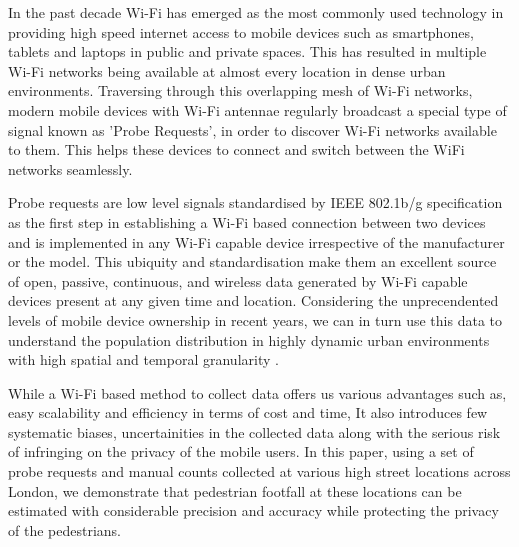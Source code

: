In the past decade Wi-Fi has emerged as the most commonly used technology in providing high speed internet access to mobile devices such as smartphones, tablets and laptops in public and private spaces. This has resulted in multiple Wi-Fi networks being available at almost every location in dense urban environments. Traversing through this overlapping mesh of Wi-Fi networks, modern mobile devices with Wi-Fi antennae regularly broadcast a special type of signal known as 'Probe Requests', in order to discover Wi-Fi networks available to them. This helps these devices to connect and switch between the WiFi networks seamlessly.

Probe requests are low level signals standardised by IEEE 802.1b/g specification \citep{ieee2013} as the first step in establishing a Wi-Fi based connection between two devices and is implemented in any Wi-Fi capable device irrespective of the manufacturer or the model. This ubiquity and standardisation make them an excellent source of open, passive, continuous, and wireless data generated by Wi-Fi capable devices present at any given time and location. Considering the unprecendented levels of mobile device ownership in recent years, we can in turn use this data to understand the population distribution in highly dynamic urban environments with high spatial and temporal granularity \citep{freud2015,konto2017}.

While a Wi-Fi based method to collect data offers us various advantages such as, easy scalability and efficiency in terms of cost and time, It also introduces few systematic biases, uncertainities in the collected data along with the serious risk of infringing on the privacy of the mobile users. In this paper, using a set of probe requests and manual counts collected at various high street locations across London, we demonstrate that pedestrian footfall at these locations can be estimated with considerable precision and accuracy while protecting the privacy of the pedestrians.
